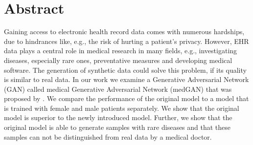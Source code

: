 \documentclass[11pt, a4paper, oneside]{book}
\def\blankpage{%
      \clearpage%
      \thispagestyle{empty}%
      \addtocounter{page}{-1}%
      \null%
      \clearpage}
\begin{document}
\pagestyle{fancy}
\thispagestyle{empty}
\renewcommand{\bibname}{References}

\renewcommand\theadfont{\normalsize}

\thispagestyle{empty}
\maketitle

\blankpage

\thispagestyle{empty}
\section*{Abstract}
Gaining access to electronic health record data comes with numerous hardships, due to hindrances like, e.g., the risk of hurting a patient's privacy. However, EHR data plays a central role in medical research in many fields, e.g., investigating diseases, especially rare ones, preventative measures and developing medical software. The generation of synthetic data could solve this problem, if its quality is similar to real data. In our work we examine a Generative Adversarial Network (GAN) called medical Generative Adversarial Network (medGAN) that was proposed by \citep{Choi2017}. We compare the performance of the original model to a model that is trained with female and male patients separately. We show that the original model is superior to the newly introduced model. Further, we show that the original model is able to generate samples with rare diseases and that these samples can not be distinguished from  real data by a medical doctor.


\blankpage

\clearpage

\thispagestyle{empty}

\tableofcontents

\listoffigures %

\listoftables %

\clearpage

\blankpage


\end{document}
